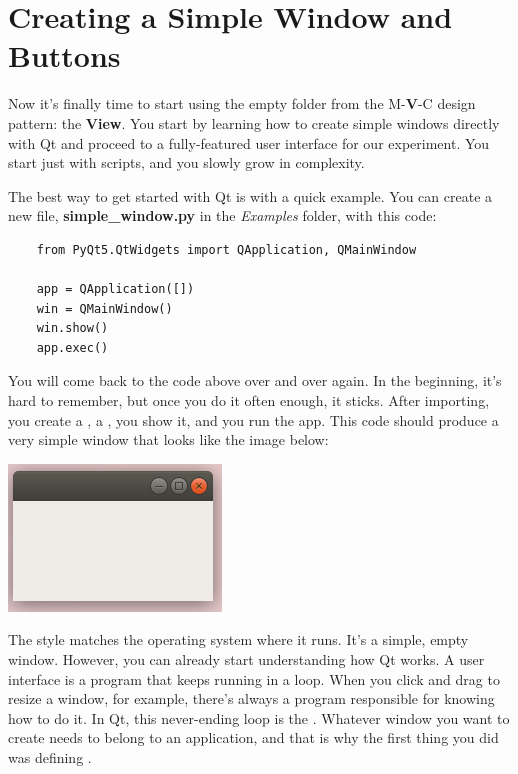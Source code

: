 \section{Creating a Simple Window and Buttons}\label{sec:simple-window-andbuttons}
Now it's finally time to start using the empty folder from the M-\textbf{V}-C design pattern: the \textbf{View}. You start by learning how to create simple windows directly with Qt and proceed to a fully-featured user interface for our experiment. You start just with scripts, and you slowly grow in complexity.

The best way to get started with Qt is with a quick example. You can create a new file, \textbf{simple\_window.py} in the \emph{Examples} folder, with this code:

\begin{verbatim}
    from PyQt5.QtWidgets import QApplication, QMainWindow

    app = QApplication([])
    win = QMainWindow()
    win.show()
    app.exec()
\end{verbatim}

You will come back to the code above over and over again. In the beginning, it's hard to remember, but once you do it often enough, it sticks. After importing, you create a , a , you show it, and you run the app. This code should produce a very simple window that looks like the image below:

\begin{center}
    \includegraphics[width=.3\textwidth]{images/Chapter_08/01_simple_window.png}
\end{center}

The style matches the operating system where it runs. It's a simple, empty window. However, you can already start understanding how Qt works. A user interface is a program that keeps running in a loop. When you click and drag to resize a window, for example, there's always a program responsible for knowing how to do it. In Qt, this never-ending loop is the . Whatever window you want to create needs to belong to an application, and that is why the first thing you did was defining .

